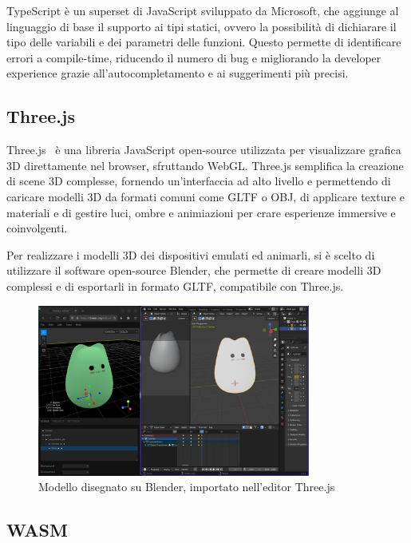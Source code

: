TypeScript è un superset di JavaScript sviluppato da Microsoft, che aggiunge al linguaggio di base il supporto ai tipi statici, 
ovvero la possibilità di dichiarare il tipo delle variabili e dei parametri delle funzioni.
Questo permette di identificare errori a compile-time, riducendo il numero di bug e migliorando la 
developer experience grazie all'autocompletamento e ai suggerimenti più precisi.

\subsection{Three.js}

Three.js~\cite{threejs_website} è una libreria JavaScript open-source utilizzata per visualizzare grafica 3D direttamente nel browser, 
sfruttando WebGL. 
Three.js semplifica la creazione di scene 3D complesse, fornendo un'interfaccia ad alto livello e permettendo di 
caricare modelli 3D da formati comuni come GLTF o OBJ, di applicare texture e materiali e di gestire luci, ombre 
e animiazioni per crare esperienze immersive e coinvolgenti.

Per realizzare i modelli 3D dei dispositivi emulati ed animarli, si è scelto di utilizzare il software open-source Blender,
che permette di creare modelli 3D complessi e di esportarli in formato GLTF, compatibile con Three.js.

\begin{figure}[H]
    \centering
    \includegraphics[width=0.8\textwidth]{images/chapter4/blender.png}
    \caption{Modello disegnato su Blender, importato nell'editor Three.js}
    \label{fig:blender}
  \end{figure}

\subsection{WASM}

